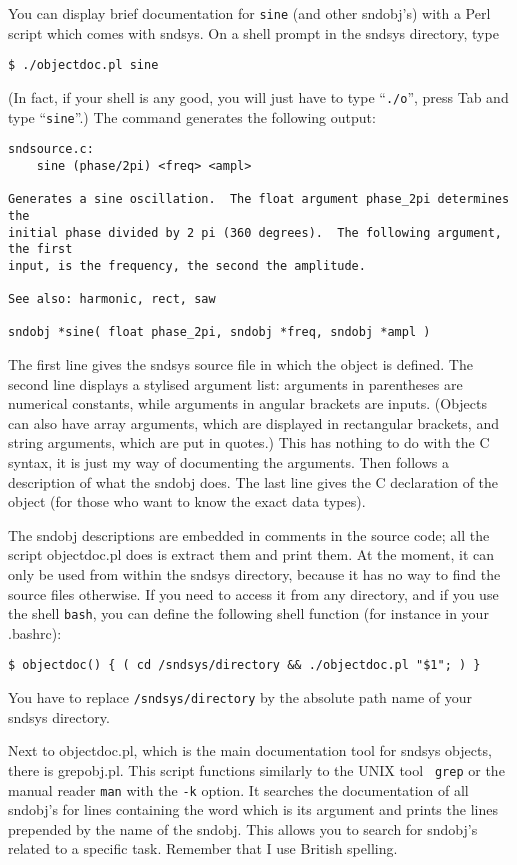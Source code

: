 \documentclass{article}
\def\s{{\sc sndsys} }
\def\sn{{\sc sndsys}}
\def\bv{\begin{verbatim}}
\begin{document}
You can display brief documentation for {\tt sine} (and other sndobj's) with
a Perl script which comes with \sn.  On a shell prompt in the \s directory,
type

\bv
$ ./objectdoc.pl sine
\end{verbatim}

(In fact, if your shell is any good, you will just have to type ``{\tt ./o}'',
press Tab and type ``{\tt sine}''.)  The command generates the following output:

\bv
sndsource.c:
    sine (phase/2pi) <freq> <ampl>

Generates a sine oscillation.  The float argument phase_2pi determines the
initial phase divided by 2 pi (360 degrees).  The following argument, the first
input, is the frequency, the second the amplitude.

See also: harmonic, rect, saw

sndobj *sine( float phase_2pi, sndobj *freq, sndobj *ampl )
\end{verbatim}

The first line gives the \s source file in which  the object is defined.  The
second line displays a stylised argument list: arguments in parentheses are
numerical constants, while arguments in angular brackets are inputs.
(Objects can also have array arguments, which are displayed in rectangular
brackets, and string arguments, which are put in quotes.)  This has nothing to
do with the C syntax, it is just my way of documenting the arguments.  Then
follows a description of what the sndobj does.  The last line gives the C
declaration of the object (for those who want to know the exact data types).

The sndobj descriptions are embedded in comments in the source code; all the 
script objectdoc.pl does is extract them and print them.  At the moment,
it can only be used from within the \s directory, because it has no way to find
the source files otherwise.  If you need to access it from any directory, and
if you use the shell {\tt bash}, you can define the following shell function
(for instance in your .bashrc):

\bv
$ objectdoc() { ( cd /sndsys/directory && ./objectdoc.pl "$1"; ) }
\end{verbatim}

You have to replace {\tt /sndsys/directory} by the absolute path name of
your \s directory.

Next to objectdoc.pl, which is the main documentation tool for \s objects,
there is grepobj.pl.  This script functions similarly to the UNIX tool {\tt
grep} or the manual reader {\tt man} with the {\tt -k} option.  It searches the
documentation of all sndobj's for lines containing the word which is its
argument and prints the lines prepended by the name of the sndobj.  This allows
you to search for sndobj's related to a specific task.  Remember that I use
British spelling.
\end{document}
